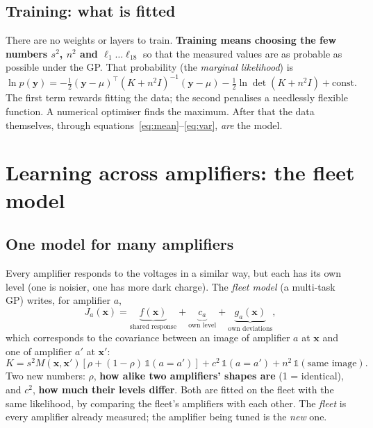 \documentclass[11pt]{article}
\newcommand{\x}{\mathbf{x}}
\begin{document}
\subsection{Training: what is fitted}
There are no weights or layers to train. \textbf{Training means choosing the few numbers $s^2$, $n^2$ and
$\ell_1\dots\ell_{18}$} so that the measured values are as probable as possible under the GP. That probability (the
\emph{marginal likelihood}) is
\begin{equation}
\ln p(\mathbf y) = -\tfrac12(\mathbf y-\mu)^{\!\top}(K+n^2I)^{-1}(\mathbf y-\mu) - \tfrac12\ln\det(K+n^2I) + \text{const}.
\end{equation}
The first term rewards fitting the data; the second penalises a needlessly flexible function. A numerical optimiser finds
the maximum. After that the data themselves, through equations~\eqref{eq:mean}--\eqref{eq:var}, \emph{are} the model.

\section{Learning across amplifiers: the fleet model}
\subsection{One model for many amplifiers}
Every amplifier responds to the voltages in a similar way, but each has its own level (one is noisier, one has more dark
charge). The \emph{fleet model} (a multi-task GP) writes, for amplifier $a$,
\begin{equation}
J_a(\x) = \underbrace{f(\x)}_{\text{shared response}} + \underbrace{c_a}_{\text{own level}} + \underbrace{g_a(\x)}_{\text{own deviations}},
\end{equation}
which corresponds to the covariance between an image of amplifier $a$ at $\x$ and one of amplifier $a'$ at $\x'$:
\begin{equation}
K = s^2 M(\x,\x')\left[\rho + (1-\rho)\,\mathbb 1(a=a')\right] + c^2\,\mathbb 1(a=a') + n^2\,\mathbb 1(\text{same image}).
\end{equation}
Two new numbers: $\rho$, \textbf{how alike two amplifiers' shapes are} (1 = identical), and $c^2$, \textbf{how much their
levels differ}. Both are fitted on the fleet with the same likelihood, by comparing the fleet's amplifiers with each other.
The \emph{fleet} is every amplifier already measured; the amplifier being tuned is the \emph{new} one.
\end{document}
